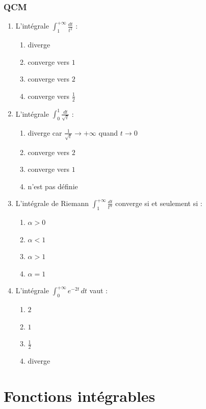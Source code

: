 \documentclass[../PolyS4.tex]{subfiles}
\begin{document}
\subsubsection*{QCM}

\begin{enumerate}
\item L'intégrale $\displaystyle\int_{1}^{+\infty} \frac{dt}{t^2}$ :
\begin{enumerate}
\item diverge
\item converge vers $1$
\item converge vers $2$
\item converge vers $\frac{1}{2}$
\end{enumerate}

\item L'intégrale $\displaystyle\int_{0}^{1} \frac{dt}{\sqrt{t}}$ :
\begin{enumerate}
\item diverge car $\frac{1}{\sqrt{t}} \to +\infty$ quand $t \to 0$
\item converge vers $2$
\item converge vers $1$
\item n'est pas définie
\end{enumerate}

\item L'intégrale de Riemann $\displaystyle\int_{1}^{+\infty} \frac{dt}{t^{\alpha}}$ converge si et seulement si :
\begin{enumerate}
\item $\alpha > 0$
\item $\alpha < 1$
\item $\alpha > 1$
\item $\alpha = 1$
\end{enumerate}

\newpage

\item L'intégrale $\displaystyle\int_{0}^{+\infty} e^{-2t} \, dt$ vaut :
\begin{enumerate}
\item $2$
\item $1$
\item $\frac{1}{2}$
\item diverge
\end{enumerate}
\end{enumerate}

\section{Fonctions intégrables}
\end{document}
